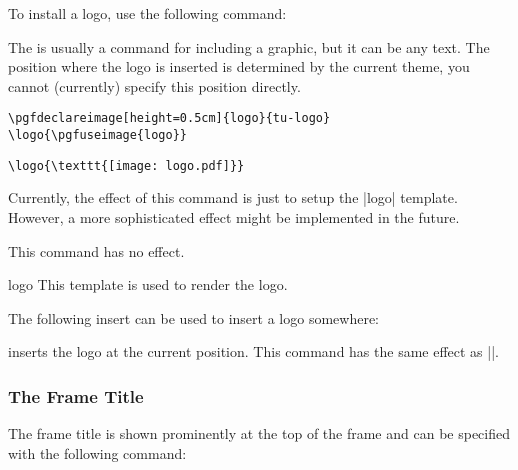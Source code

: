 To install a logo, use the following command:

\begin{command}{\logo{}}
  The  is usually a command for including a graphic,
  but it can be any text. The position where the logo is inserted is
  determined by the current theme, you cannot (currently) specify this
  position directly.

  \example
\begin{verbatim}
\pgfdeclareimage[height=0.5cm]{logo}{tu-logo}
\logo{\pgfuseimage{logo}}
\end{verbatim}

  \example
\begin{verbatim}
\logo{\texttt{[image: logo.pdf]}}
\end{verbatim}

  Currently, the effect of this command is just to setup the |logo|
  template. However, a more sophisticated effect might be implemented
  in the future.

  \articlenote This command has no effect.

  \begin{element}{logo}\yes\yes\yes
    This template is used to render the logo.
  \end{element}

  The following insert can be used to insert a logo somewhere:
  \begin{itemize}
    \iteminsert{\insertlogo}
    inserts the logo at the current position. This command has the
    same effect as ||.
  \end{itemize}
\end{command}


\subsubsection{The Frame Title}

The frame title is shown prominently at the top of the frame and can
be specified with the following command:

